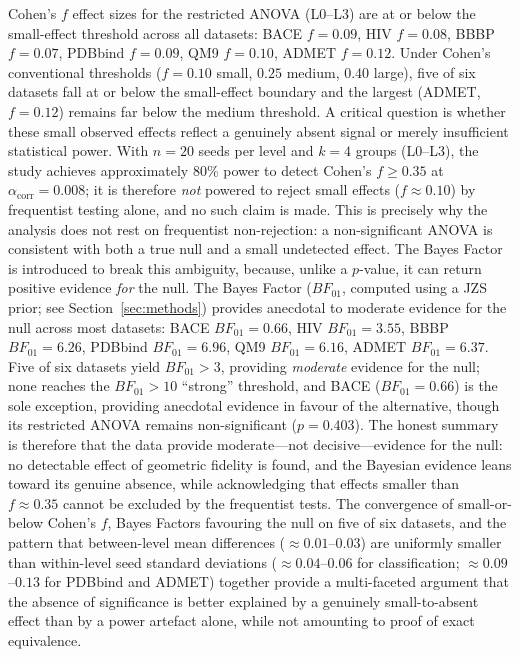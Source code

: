 \documentclass[pdflatex,sn-vancouver-num]{sn-jnl}%
\theoremstyle{thmstyleone}%
\theoremstyle{thmstyletwo}%
\theoremstyle{thmstylethree}%
\begin{document}
Cohen's $f$ effect sizes for the restricted ANOVA (L0--L3) are at or below
the small-effect threshold across all datasets: BACE $f = 0.09$, HIV $f = 0.08$,
BBBP $f = 0.07$, PDBbind $f = 0.09$, QM9 $f = 0.10$,
ADMET $f = 0.12$.  Under Cohen's conventional thresholds ($f = 0.10$ small,
$0.25$ medium, $0.40$ large), five of six datasets fall at or below the
small-effect boundary and the largest (ADMET, $f = 0.12$) remains far below
the medium threshold.  A critical question is whether these small observed effects
reflect a genuinely absent signal or merely insufficient statistical power.
With $n{=}20$ seeds per level and $k{=}4$ groups (L0--L3), the study
achieves approximately 80\% power to detect Cohen's $f \geq 0.35$ at
$\alpha_\mathrm{corr} = 0.008$; it is therefore \emph{not} powered to reject
small effects ($f \approx 0.10$) by frequentist testing alone, and no such claim is made.  This is precisely why the analysis does not rest on
frequentist non-rejection: a non-significant ANOVA is consistent with both a
true null and a small undetected effect.  The Bayes Factor is introduced to
break this ambiguity, because, unlike a $p$-value, it can return positive
evidence \emph{for} the null.  The Bayes Factor ($BF_{01}$, computed using a JZS prior; see Section~\ref{sec:methods}) provides anecdotal to moderate evidence for the null across most
datasets: BACE $BF_{01} = 0.66$, HIV $BF_{01} = 3.55$, BBBP
$BF_{01} = 6.26$, PDBbind $BF_{01} = 6.96$, QM9 $BF_{01} = 6.16$,
ADMET $BF_{01} = 6.37$.
Five of six datasets yield $BF_{01} > 3$, providing \emph{moderate} evidence for the null; none reaches the $BF_{01} > 10$ ``strong'' threshold, and BACE ($BF_{01} = 0.66$) is the sole exception, providing anecdotal evidence in favour of the alternative, though its restricted ANOVA remains non-significant ($p = 0.403$).  The honest summary is therefore that the data provide moderate---not decisive---evidence for the null: no detectable effect of geometric fidelity is found, and the Bayesian evidence leans toward its genuine absence, while acknowledging that effects smaller than $f \approx 0.35$ cannot be excluded by the frequentist tests.  The convergence of
small-or-below Cohen's $f$, Bayes Factors favouring the null on five of six datasets, and the pattern that
between-level mean differences ($\approx 0.01$--$0.03$) are uniformly
smaller than within-level seed standard deviations ($\approx 0.04$--$0.06$ for
classification; $\approx 0.09$--$0.13$ for PDBbind and ADMET)
together provide a multi-faceted argument that the absence of significance
is better explained by a genuinely small-to-absent effect than by a power
artefact alone, while not amounting to proof of exact equivalence.
\end{document}
